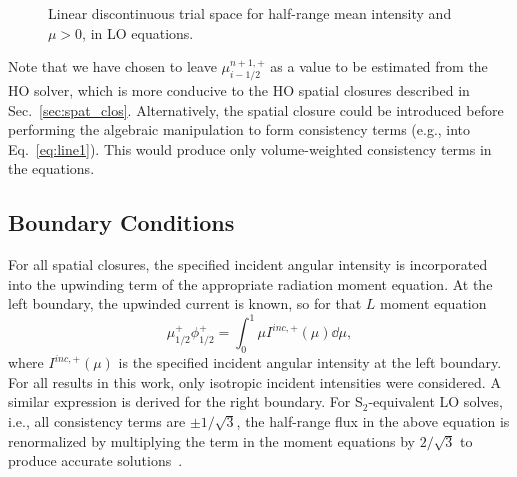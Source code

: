 \begin{figure}[H]
    \centering
    {}
    \caption{Linear discontinuous trial space for half-range mean intensity and $\mu>0$,
        in LO equations.\label{fig:ld_il}}
\end{figure}

Note that we have chosen to leave $\mu_{i-1/2}^{n+1,+}$ as a value to be estimated from the HO solver,
which is more conducive to the HO spatial closures described in
Sec.~\ref{sec:spat_clos}.
Alternatively, the spatial closure could be introduced before performing the algebraic
manipulation to form consistency terms (e.g., into Eq.~\eqref{eq:line1}).  This would produce only volume-weighted consistency
terms in the equations.  




\subsection{Boundary Conditions}

For all spatial closures, the specified incident angular intensity is
incorporated into the upwinding term of the appropriate radiation moment equation.   At the left
boundary, the upwinded current is known, so for that $L$ moment equation
\begin{equation}
    \mu_{1/2}^+ \phi_{1/2}^+ = \int_{0}^1 \mu I^{inc,+}(\mu) \dd \mu,
\end{equation}
where $I^{inc,+}(\mu)$ is the specified incident angular intensity at the left boundary.  For all
results in this work, only isotropic incident intensities were considered.
A similar expression is derived for the right boundary.
  For S$_2$-equivalent LO solves, i.e., all consistency
terms are $\pm 1/\sqrt{3}$, the half-range flux in the above equation is renormalized by
multiplying the term in the moment equations by $2/\sqrt{3}$ to produce accurate solutions~\cite{morel_notes}.     


